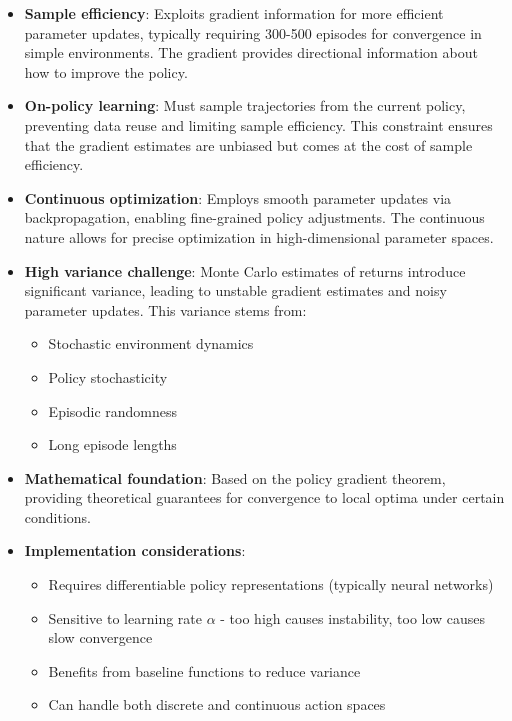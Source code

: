 \documentclass[12pt]{article}
\begin{document}
{{{\begin{itemize}
    \item \textbf{Sample efficiency}: Exploits gradient information for more efficient parameter updates, typically requiring 300-500 episodes for convergence in simple environments. The gradient provides directional information about how to improve the policy.
    
    \item \textbf{On-policy learning}: Must sample trajectories from the current policy, preventing data reuse and limiting sample efficiency. This constraint ensures that the gradient estimates are unbiased but comes at the cost of sample efficiency.
    
    \item \textbf{Continuous optimization}: Employs smooth parameter updates via backpropagation, enabling fine-grained policy adjustments. The continuous nature allows for precise optimization in high-dimensional parameter spaces.
    
    \item \textbf{High variance challenge}: Monte Carlo estimates of returns introduce significant variance, leading to unstable gradient estimates and noisy parameter updates. This variance stems from:
    \begin{itemize}
        \item Stochastic environment dynamics
        \item Policy stochasticity
        \item Episodic randomness
        \item Long episode lengths
    \end{itemize}
    
    \item \textbf{Mathematical foundation}: Based on the policy gradient theorem, providing theoretical guarantees for convergence to local optima under certain conditions.
    
    \item \textbf{Implementation considerations}:
    \begin{itemize}
        \item Requires differentiable policy representations (typically neural networks)
        \item Sensitive to learning rate $\alpha$ - too high causes instability, too low causes slow convergence
        \item Benefits from baseline functions to reduce variance
        \item Can handle both discrete and continuous action spaces
    \end{itemize}
\end{itemize}

}}}
\end{document}
